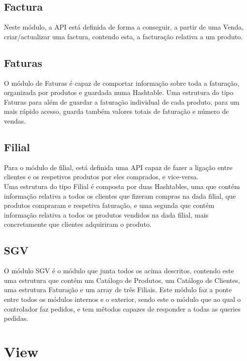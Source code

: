\documentclass[a4paper]{report}
\begin{document}
\subsection{Factura}

Neste módulo, a API está definida de forma a conseguir, a partir de uma Venda,
criar/actualizar uma factura, contendo esta, a facturação relativa a um produto.

\subsection{Faturas}

O módulo de Faturas é capaz de comportar informação sobre toda a faturação,
organizada por produtos e guardada numa Hashtable. Uma estrutura do tipo Faturas
para além de guardar a faturação individual de cada produto, para um mais rápido 
acesso, guarda também valores totais de faturação e número de vendas.

\subsection{Filial}

Para o módulo de filial, está definida uma API capaz de fazer a ligação entre 
clientes e os respetivos produtos por eles comprados, e vice-versa.\\
Uma estrutura do tipo Filial é composta por duas Hashtables, uma que contém
informação relativa a todos os clientes que fizeram compras na dada filial, 
que produtos compraram e respetiva faturação, e uma segunda que contém 
informação relativa a todos os produtos vendidos na dada filial, mais 
concretamente que clientes adquiriram o produto.

\subsection{SGV}

O módulo SGV é o módulo que junta todos os acima descritos, contendo este uma estrutura
que contém um Catálogo de Produtos, um Catálogo de Clientes, uma estrutura Faturação e 
um array de três Filiais. Este módulo faz a ponte entre todos os módulos internos e o 
exterior, sendo este o módulo que ao qual o controlador faz pedidos, e tem 
métodos capazes de responder a todas as queries pedidas.


\section{View}
\end{document}
